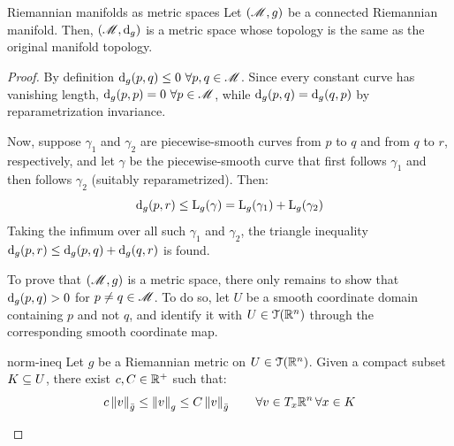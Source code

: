 \begin{theorem}{Riemannian manifolds as metric spaces}{}
  Let $ (\mathscr{M},g) $ be a connected Riemannian manifold. Then, $ (\mathscr{M},\mathrm{d}_g) $ is a metric space whose topology is the same as the original manifold topology.
\end{theorem}

\begin{proofbox}
  \begin{proof}
    By definition $ \mathrm{d}_g(p,q) \leq 0 \,\,\forall p,q \in \mathscr{M} $. Since every constant curve has vanishing length, $ \mathrm{d}_g(p,p) = 0 \,\,\forall p \in \mathscr{M} $, while $ \mathrm{d}_g(p,q) = \mathrm{d}_g(q,p) $ by reparametrization invariance.

    Now, suppose $ \gamma_1 $ and $ \gamma_2 $ are piecewise-smooth curves from $ p $ to $ q $ and from $ q $ to $ r $, respectively, and let $ \gamma $ be the piecewise-smooth curve that first follows $ \gamma_1 $ and then follows $ \gamma_2 $ (suitably reparametrized). Then:
    \begin{equation*}
      \mathrm{d}_g(p,r) \leq \mathrm{L}_g(\gamma) = \mathrm{L}_g(\gamma_1) + \mathrm{L}_g(\gamma_2)
    \end{equation*}
    Taking the infimum over all such $ \gamma_1 $ and $ \gamma_2 $, the triangle inequality $ \mathrm{d}_g(p,r) \leq \mathrm{d}_g(p,q) + \mathrm{d}_g(q,r) $ is found.

    To prove that $ (\mathscr{M},g) $ is a metric space, there only remains to show that $ \mathrm{d}_g(p,q) > 0 $ for $ p \neq q \in \mathscr{M} $. To do so, let $ U $ be a smooth coordinate domain containing $ p $ and not $ q $, and identify it with $ U \in \EuScript{T}(\mathbb{R}^n) $ through the corresponding smooth coordinate map.

    \begin{lemma}{}{norm-ineq}
      Let $ g $ be a Riemannian metric on $ U \in \EuScript{T}(\mathbb{R}^n) $. Given a compact subset $ K \subseteq U $, there exist $ c,C \in \mathbb{R}^+ $ such that:
      \begin{equation}
        c \left\lVert v\right\rVert_{\bar{g}} \leq \left\lVert v\right\rVert_g \leq C \left\lVert v\right\rVert_{\bar{g}}
        \qquad
        \forall v \in T_x \mathbb{R}^n \, \forall x \in K
        \label{eq:norm-ineq}
      \end{equation}
    \end{lemma}


\end{proof}
\end{proofbox}
